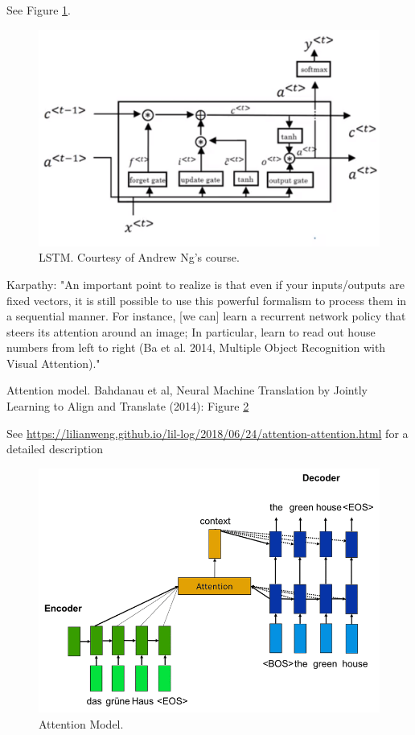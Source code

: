 \documentclass[english]{article}
\begin{document}
See Figure \ref{lstm}. 

\begin{figure}
  \centering
  \includegraphics[scale=0.3]{lstm.png}
    \caption{LSTM. Courtesy of Andrew Ng's course.}
    \label{lstm}
\end{figure}


\item  Karpathy: "An important point to realize is that even if your inputs/outputs are fixed vectors, it is still possible to use this powerful formalism to process them in a sequential manner. For instance, [we can] learn a recurrent network policy that steers its attention around an image; In particular, learn to read out house numbers from left to right (Ba et al. 2014, Multiple Object Recognition with Visual Attention)."

\item Attention model. Bahdanau et al, Neural Machine Translation by Jointly Learning to Align and Translate (2014): Figure \ref{attn}

See \url{https://lilianweng.github.io/lil-log/2018/06/24/attention-attention.html} for a detailed description


\begin{figure}
  \centering
  \includegraphics[scale=0.3]{attn}
    \caption{Attention Model.}
    \label{attn}
\end{figure}
\end{document}
